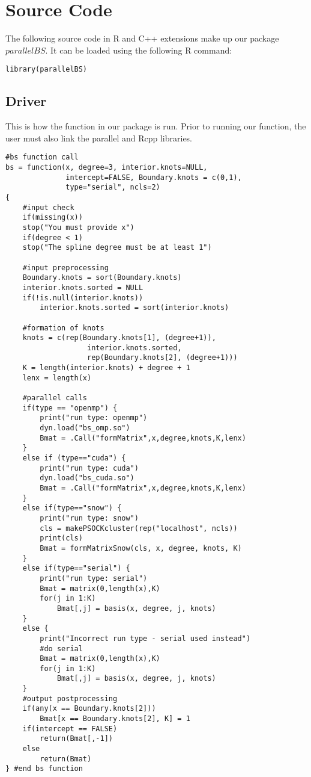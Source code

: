 \section{Source Code}
The following source code in R and C++ extensions make up our package $parallelBS$. It can be loaded using the following R command:
\begin{verbatim}
library(parallelBS)
\end{verbatim}

\subsection{Driver}
This is how the function in our package is run. Prior to running our function, the user must also link the parallel and Rcpp libraries.
\lstset{language=R}
\begin{lstlisting}
#bs function call
bs = function(x, degree=3, interior.knots=NULL,
              intercept=FALSE, Boundary.knots = c(0,1),
              type="serial", ncls=2)
{
    #input check
    if(missing(x))
    stop("You must provide x")
    if(degree < 1)
    stop("The spline degree must be at least 1")

    #input preprocessing
    Boundary.knots = sort(Boundary.knots)
    interior.knots.sorted = NULL
    if(!is.null(interior.knots))
        interior.knots.sorted = sort(interior.knots)

    #formation of knots
    knots = c(rep(Boundary.knots[1], (degree+1)),
                   interior.knots.sorted,
                   rep(Boundary.knots[2], (degree+1)))
    K = length(interior.knots) + degree + 1
    lenx = length(x)

    #parallel calls
    if(type == "openmp") {
        print("run type: openmp")
        dyn.load("bs_omp.so")
        Bmat = .Call("formMatrix",x,degree,knots,K,lenx)
    }
    else if (type=="cuda") {
        print("run type: cuda")
        dyn.load("bs_cuda.so")
        Bmat = .Call("formMatrix",x,degree,knots,K,lenx)
    }
    else if(type=="snow") {
        print("run type: snow")
        cls = makePSOCKcluster(rep("localhost", ncls))
        print(cls)
        Bmat = formMatrixSnow(cls, x, degree, knots, K)
    }
    else if(type=="serial") {
        print("run type: serial")
        Bmat = matrix(0,length(x),K)
        for(j in 1:K)
            Bmat[,j] = basis(x, degree, j, knots)
    }
    else {
        print("Incorrect run type - serial used instead")
        #do serial
        Bmat = matrix(0,length(x),K)
        for(j in 1:K)
            Bmat[,j] = basis(x, degree, j, knots)
    }
    #output postprocessing
    if(any(x == Boundary.knots[2]))
        Bmat[x == Boundary.knots[2], K] = 1
    if(intercept == FALSE)
        return(Bmat[,-1])
    else
        return(Bmat)
} #end bs function

\end{lstlisting}

